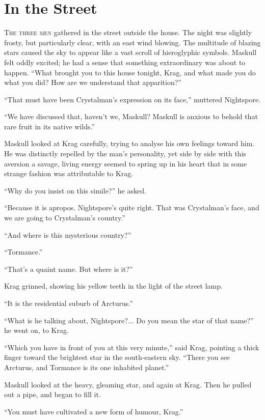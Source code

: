 \chapter{In the Street}
\lettrine{T}{he three men} gathered in the street outside the house. The night was slightly frosty, but particularly clear, with an east wind blowing. The multitude of blazing stars caused the sky to appear like a vast scroll of hieroglyphic symbols. Maskull felt oddly excited; he had a sense that something extraordinary was about to happen. ``What brought you to this house tonight, Krag, and what made you do what you did? How are we understand that apparition?''

``That must have been Crystalman's expression on its face,'' muttered Nightspore.

``We have discussed that, haven't we, Maskull? Maskull is anxious to behold that rare fruit in its native wilds.''

Maskull looked at Krag carefully, trying to analyse his own feelings toward him. He was distinctly repelled by the man's personality, yet side by side with this aversion a savage, living energy seemed to spring up in his heart that in some strange fashion was attributable to Krag.

``Why do you insist on this simile?'' he asked.

``Because it is apropos. Nightspore's quite right. That was Crystalman's face, and we are going to Crystalman's country.''

``And where is this mysterious country?''

``Tormance.''

``That's a quaint name. But where is it?''

Krag grinned, showing his yellow teeth in the light of the street lamp.

``It is the residential suburb of Arcturus.''

``What is he talking about, Nightspore?... Do you mean the star of that name?'' he went on, to Krag.

``Which you have in front of you at this very minute,'' said Krag, pointing a thick finger toward the brightest star in the south-eastern sky. ``There you see Arcturus, and Tormance is its one inhabited planet.''

Maskull looked at the heavy, gleaming star, and again at Krag. Then he pulled out a pipe, and began to fill it.

``You must have cultivated a new form of humour, Krag.''

